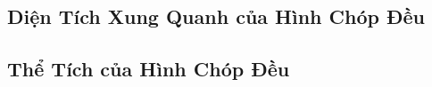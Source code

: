 \documentclass{article}
\numberwithin{equation}{section}
\begin{document}

\subsection{Diện Tích Xung Quanh của Hình Chóp Đều}


\subsection{Thể Tích của Hình Chóp Đều}


\printbibliography[heading=bibintoc]
	
\end{document}
